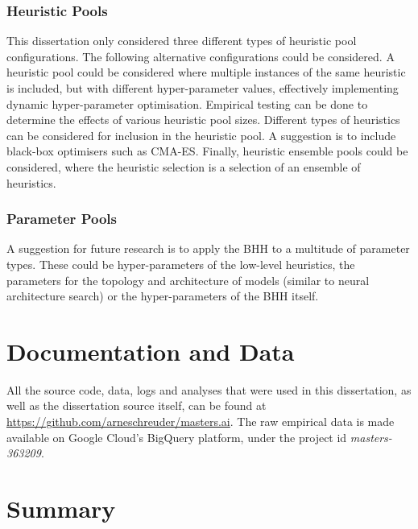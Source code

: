 \subsubsection{Heuristic Pools}
\label{sec:conclusion:further_research:heuristic_pools}

This dissertation only considered three different types of heuristic pool configurations. The following alternative configurations could be considered. A heuristic pool could be considered where multiple instances of the same heuristic is included, but with different hyper-parameter values, effectively implementing dynamic hyper-parameter optimisation. Empirical testing can be done to determine the effects of various heuristic pool sizes. Different types of heuristics can be considered for inclusion in the heuristic pool. A suggestion is to include black-box optimisers such as \acs{CMA-ES}. Finally, heuristic ensemble pools could be considered, where the heuristic selection is a selection of an ensemble of heuristics.

\subsubsection{Parameter Pools}
\label{sec:conclusion:further_research:parameter_pools}

A suggestion for future research is to apply the \acs{BHH} to a multitude of parameter types. These could be hyper-parameters of the low-level heuristics, the parameters for the topology and architecture of models (similar to neural architecture search) or the hyper-parameters of the \acs{BHH} itself.

\section{Documentation and Data}
\label{sec:conclusion:documentation_and_data}

All the source code, data, logs and analyses that were used in this dissertation, as well as the dissertation source itself, can be found at \url{https://github.com/arneschreuder/masters.ai}. The raw empirical data is made available on Google Cloud's BigQuery platform, under the project id \textit{masters-363209}.


\section{Summary}
\label{sec:conclusion:summary}

